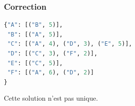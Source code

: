 \documentclass[svgnames,11pt]{beamer}
\begin{document}
\begin{frame}[fragile]
    \frametitle{Correction}

    \begin{center}
        \begin{lstlisting}[language=Python , basicstyle=\ttfamily\small, xleftmargin=2em, xrightmargin=2em]
{"A": [("B", 5)],
 "B": [("A", 5)],
 "C": [("A", 4), ("D", 3), ("E", 5)],
 "D": [("C", 3), ("F", 2)],
 "E": [("C", 5)],
 "F": [("A", 6), ("D", 2)]
}
\end{lstlisting}
        \end{center}   
\begin{aretenir}[Remarque]
Cette solution n'est pas unique.
\end{aretenir}
\end{frame}
\end{document}
